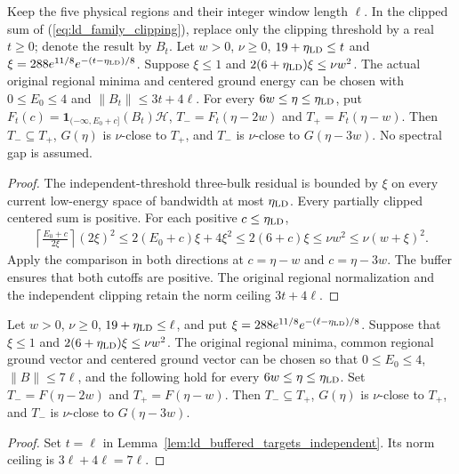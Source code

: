 \begin{lemma}
    \label{lem:ld_buffered_targets_independent}
    \leanok
    Keep the five physical regions and their integer window length $\ell$.
    In the clipped sum of (\ref{eq:ld_family_clipping}), replace only the
    clipping threshold by a real $t\ge0$; denote the result by $B_t$.
    Let $w>0$, $\nu\ge0$, $19+\eta_{\rm LD}\le t$ and
    $\xi=288e^{11/8}e^{-(t-\eta_{\rm LD})/8}$. Suppose
    $\xi\le1$ and $2(6+\eta_{\rm LD})\xi\le\nu w^2$.
    The actual original regional minima and centered ground energy can
    be chosen with $0\le E_0\le4$ and $\|B_t\|\le3t+4\ell$.
    For every $6w\le\eta\le\eta_{\rm LD}$, put
    $F_t(c)=\mathbf1_{(-\infty,E_0+c]}(B_t)\mathcal H$,
    $T_-=F_t(\eta-2w)$ and $T_+=F_t(\eta-w)$.
    Then $T_-\subseteq T_+$, $G(\eta)$ is $\nu$-close to $T_+$,
    and $T_-$ is $\nu$-close to $G(\eta-3w)$.
    No spectral gap is assumed.
\end{lemma}
\begin{proof}\leanok
    The independent-threshold three-bulk residual is bounded by $\xi$
    on every current low-energy space of bandwidth at most
    $\eta_{\rm LD}$. Every partially clipped centered sum is positive.
    For each positive $c\le\eta_{\rm LD}$,
    \begin{align}
        \left\lceil\frac{E_0+c}{2\xi}\right\rceil(2\xi)^2
        \le 2(E_0+c)\xi+4\xi^2
        \le2(6+c)\xi\le\nu w^2\le\nu(w+\xi)^2.
        \label{eq:ld_family_window_budget}
    \end{align}
    Apply the comparison in both directions at $c=\eta-w$ and
    $c=\eta-3w$. The buffer ensures that both cutoffs are positive.
    The original regional normalization and the independent clipping
    retain the norm ceiling $3t+4\ell$.
\end{proof}

\begin{lemma}
    \label{lem:ld_buffered_targets_at_error}
    \leanok
    Let $w>0$, $\nu\ge0$, $19+\eta_{\rm LD}\le\ell$, and put
    $\xi=288e^{11/8}e^{-(\ell-\eta_{\rm LD})/8}$.
    Suppose that $\xi\le1$ and
    $2(6+\eta_{\rm LD})\xi\le\nu w^2$.
    The original regional minima, common regional ground vector and
    centered ground vector can be chosen so that $0\le E_0\le4$,
    $\|B\|\le7\ell$, and the following hold for every
    $6w\le\eta\le\eta_{\rm LD}$. Set
    $T_-=F(\eta-2w)$ and $T_+=F(\eta-w)$.
    Then $T_-\subseteq T_+$, $G(\eta)$ is $\nu$-close to $T_+$,
    and $T_-$ is $\nu$-close to $G(\eta-3w)$.
\end{lemma}
\begin{proof}\leanok
    Set $t=\ell$ in Lemma~\ref{lem:ld_buffered_targets_independent}.
    Its norm ceiling is $3\ell+4\ell=7\ell$.
\end{proof}

